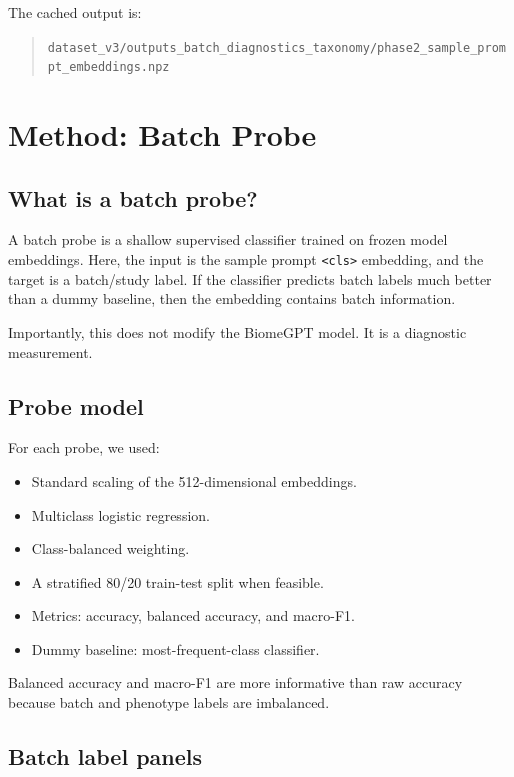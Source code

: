 \documentclass[11pt]{article}
\newcommand{\code}[1]{\texttt{\small #1}}
\begin{document}
The cached output is:

\begin{quote}
\code{dataset\_v3/outputs\_batch\_diagnostics\_taxonomy/phase2\_sample\_prompt\_embeddings.npz}
\end{quote}

\section{Method: Batch Probe}

\subsection{What is a batch probe?}

A batch probe is a shallow supervised classifier trained on frozen model embeddings.
Here, the input is the sample prompt \code{<cls>} embedding, and the target is a
batch/study label. If the classifier predicts batch labels much better than a dummy
baseline, then the embedding contains batch information.

Importantly, this does not modify the BiomeGPT model. It is a diagnostic measurement.

\subsection{Probe model}

For each probe, we used:

\begin{itemize}
  \item Standard scaling of the 512-dimensional embeddings.
  \item Multiclass logistic regression.
  \item Class-balanced weighting.
  \item A stratified 80/20 train-test split when feasible.
  \item Metrics: accuracy, balanced accuracy, and macro-F1.
  \item Dummy baseline: most-frequent-class classifier.
\end{itemize}

Balanced accuracy and macro-F1 are more informative than raw accuracy because batch and
phenotype labels are imbalanced.

\subsection{Batch label panels}
\end{document}
